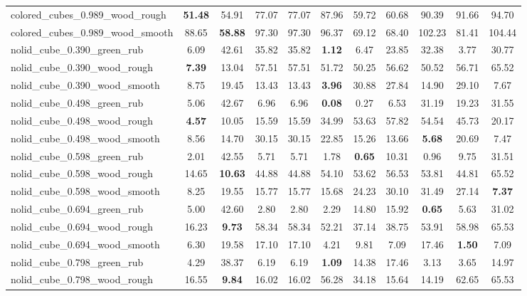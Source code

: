 \begin{table}[H]
{\begin{tabular}{l cccccccccc}
        colored\_cubes\_0.989\_wood\_rough & \textbf{51.48} & 54.91 & 77.07 & 77.07 & 87.96 & 59.72 & 60.68 & 90.39 & 91.66 & 94.70 \\
        colored\_cubes\_0.989\_wood\_smooth & 88.65 & \textbf{58.88} & 97.30 & 97.30 & 96.37 & 69.12 & 68.40 & 102.23 & 81.41 & 104.44 \\
        nolid\_cube\_0.390\_green\_rub & 6.09 & 42.61 & 35.82 & 35.82 & \textbf{1.12} & 6.47 & 23.85 & 32.38 & 3.77 & 30.77 \\
        nolid\_cube\_0.390\_wood\_rough & \textbf{7.39} & 13.04 & 57.51 & 57.51 & 51.72 & 50.25 & 56.62 & 50.52 & 56.71 & 65.52 \\
        nolid\_cube\_0.390\_wood\_smooth & 8.75 & 19.45 & 13.43 & 13.43 & \textbf{3.96} & 30.88 & 27.84 & 14.90 & 29.10 & 7.67 \\
        nolid\_cube\_0.498\_green\_rub & 5.06 & 42.67 & 6.96 & 6.96 & \textbf{0.08} & 0.27 & 6.53 & 31.19 & 19.23 & 31.55 \\
        nolid\_cube\_0.498\_wood\_rough & \textbf{4.57} & 10.05 & 15.59 & 15.59 & 34.99 & 53.63 & 57.82 & 54.54 & 45.73 & 20.17 \\
        nolid\_cube\_0.498\_wood\_smooth & 8.56 & 14.70 & 30.15 & 30.15 & 22.85 & 15.26 & 13.66 & \textbf{5.68} & 20.69 & 7.47 \\
        nolid\_cube\_0.598\_green\_rub & 2.01 & 42.55 & 5.71 & 5.71 & 1.78 & \textbf{0.65} & 10.31 & 0.96 & 9.75 & 31.51 \\
        nolid\_cube\_0.598\_wood\_rough & 14.65 & \textbf{10.63} & 44.88 & 44.88 & 54.10 & 53.62 & 56.53 & 53.81 & 44.81 & 65.52 \\
        nolid\_cube\_0.598\_wood\_smooth & 8.25 & 19.55 & 15.77 & 15.77 & 15.68 & 24.23 & 30.10 & 31.49 & 27.14 & \textbf{7.37} \\
        nolid\_cube\_0.694\_green\_rub & 5.00 & 42.60 & 2.80 & 2.80 & 2.29 & 14.80 & 15.92 & \textbf{0.65} & 5.63 & 31.02 \\
        nolid\_cube\_0.694\_wood\_rough & 16.23 & \textbf{9.73} & 58.34 & 58.34 & 52.21 & 37.14 & 38.75 & 53.91 & 58.98 & 65.53 \\
        nolid\_cube\_0.694\_wood\_smooth & 6.30 & 19.58 & 17.10 & 17.10 & 4.21 & 9.81 & 7.09 & 17.46 & \textbf{1.50} & 7.09 \\
        nolid\_cube\_0.798\_green\_rub & 4.29 & 38.37 & 6.19 & 6.19 & \textbf{1.09} & 14.38 & 17.46 & 3.13 & 3.65 & 14.97 \\
        nolid\_cube\_0.798\_wood\_rough & 16.55 & \textbf{9.84} & 16.02 & 16.02 & 56.28 & 34.18 & 15.64 & 14.19 & 62.65 & 65.53 \\

\end{tabular}}
\end{table}
